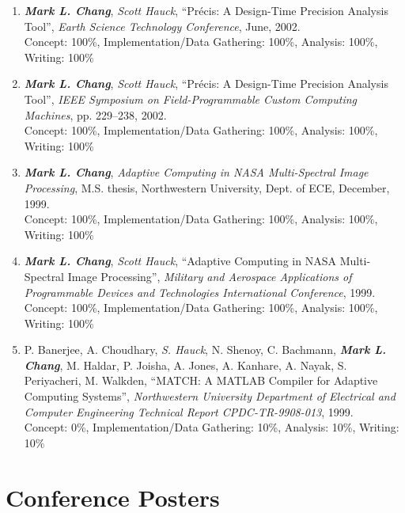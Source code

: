 \documentclass[line]{res}
\begin{document}
\begin{resume}
\begin{enumerate}
		\item \textbf{\textit{Mark L. Chang}}, \textit{Scott Hauck}, ``Pr\'{e}cis: A Design-Time Precision Analysis Tool'', \emph{Earth Science Technology Conference}, June, 2002.\\
		Concept: 100\%, Implementation/Data Gathering: 100\%, Analysis: 100\%, Writing: 100\%
		
		\item \textbf{\textit{Mark L. Chang}}, \textit{Scott Hauck}, ``Pr\'{e}cis: A Design-Time Precision Analysis Tool'', \emph{IEEE Symposium on Field-Programmable Custom Computing Machines}, pp. 229--238, 2002.\\
		Concept: 100\%, Implementation/Data Gathering: 100\%, Analysis: 100\%, Writing: 100\%
		
		\item \textbf{\textit{Mark L. Chang}}, \emph{Adaptive Computing in NASA Multi-Spectral Image Processing}, M.S. thesis, Northwestern University, Dept. of ECE, December, 1999.\\
		Concept: 100\%, Implementation/Data Gathering: 100\%, Analysis: 100\%, Writing: 100\%
		
		\item \textbf{\textit{Mark L. Chang}}, \textit{Scott Hauck}, ``Adaptive Computing in NASA Multi-Spectral Image Processing'', \emph{Military and Aerospace Applications of Programmable Devices and Technologies International Conference}, 1999.\\
		Concept: 100\%, Implementation/Data Gathering: 100\%, Analysis: 100\%, Writing: 100\%
		
		\item P. Banerjee, A. Choudhary,\textit{ S. Hauck}, N. Shenoy, C. Bachmann, \textbf{\textit{Mark L. Chang}}, M. Haldar, P. Joisha, A. Jones, A. Kanhare, A. Nayak, S. Periyacheri, M. Walkden, ``MATCH: A MATLAB Compiler for Adaptive Computing Systems'', \emph{Northwestern University Department of Electrical and Computer Engineering Technical Report CPDC-TR-9908-013}, 1999.\\
		Concept: 0\%, Implementation/Data Gathering: 10\%, Analysis: 10\%, Writing: 10\%
	\end{enumerate}
	
	\section{\sc Conference Posters}
	\begin{enumerate}
		

\end{enumerate}
\end{resume}
\end{document}
